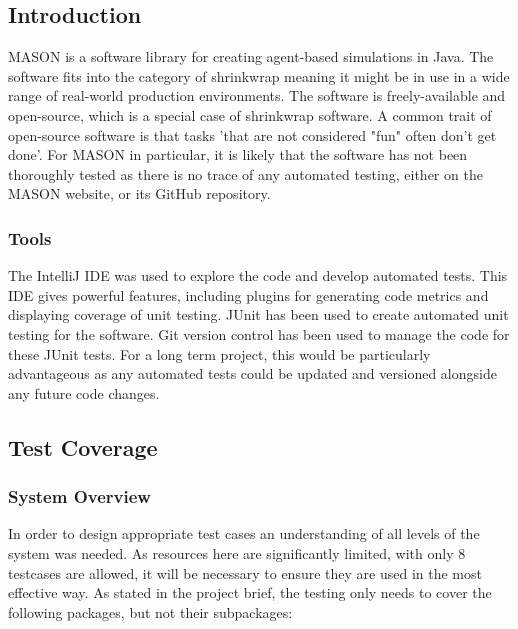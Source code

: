 \documentclass[11pt]{article}
\begin{document}
\subsection{Introduction}
MASON is a software library for creating agent-based simulations in Java. 
The software fits into the category of shrinkwrap meaning it might be in use in a wide range of real-world production environments. The software is freely-available and open-source, which is a special case of shrinkwrap software. A common trait of open-source software is that tasks 'that are not considered "fun" often don't get done'.\cite{five_worlds}
For MASON in particular, it is likely that the software has not been thoroughly tested as there is no trace of any automated testing, either on the MASON website, or its GitHub repository.


\subsubsection{Tools}
The IntelliJ IDE was used to explore the code and develop automated tests. This IDE gives powerful features, including plugins for generating code metrics and displaying coverage of unit testing.
JUnit has been used to create automated unit testing for the software.
Git version control has been used to manage the code for these JUnit tests.
For a long term project, this would be particularly advantageous as any automated tests could be updated and versioned alongside any future code changes.

\subsection{Test Coverage}
\subsubsection{System Overview}
In order to design appropriate test cases an understanding of all levels of the system was needed. As resources here are significantly limited, with only 8 testcases are allowed, it will be necessary to ensure they are used in the most effective way.
As stated in the project brief, the testing only needs to cover the following packages, but not their subpackages:
\end{document}
